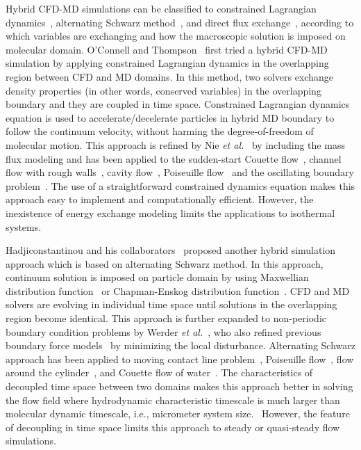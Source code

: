 \documentclass[preprint,12pt]{elsarticle}
\begin{document}
Hybrid CFD-MD simulations can be classified to constrained Lagrangian dynamics~\cite{Thompson,Nie,Nie_cavity,Cui,Wang,Yen,Liu}, alternating Schwarz method~\cite{Hadjicon1,Hadjicon2,Hadjicon3,Werder,Kotsalis}, and direct flux exchange~\cite{Flekkoy,Wagner,Delgado1,USHER,Time_Mechanism,Giupponi}, according to which variables are exchanging and how the macroscopic solution is imposed on molecular domain. O'Connell and Thompson~\cite{Thompson} first tried a hybrid CFD-MD simulation by applying constrained Lagrangian dynamics in the overlapping region between CFD and MD domains. In this method, two solvers exchange density properties (in other words, conserved variables) in the overlapping boundary and they are coupled in time space. Constrained Lagrangian dynamics equation is used to accelerate/decelerate particles in hybrid MD boundary to follow the continuum velocity, without harming the degree-of-freedom of molecular motion. This approach is refined by Nie {\it{et al.}}~\cite{Nie} by including the mass flux modeling and has been applied to the sudden-start Couette flow~\cite{Thompson}, channel flow with rough walls~\cite{Nie}, cavity flow~\cite{Nie_cavity}, Poiseuille flow~\cite{Yen} and the oscillating boundary problem~\cite{Wang,Liu}. The use of a straightforward constrained dynamics equation makes this approach easy to implement and computationally efficient. However, the inexistence of energy exchange modeling limits the applications to isothermal systems.~\cite{Flekkoy}

Hadjiconstantinou and his collaborators~\cite{Hadjicon1,Hadjicon2,Hadjicon3} proposed another hybrid simulation approach which is based on alternating Schwarz method. In this approach, continuum solution is imposed on particle domain by using Maxwellian distribution function~\cite{Hadjicon2} or Chapman-Enskog distribution function~\cite{Garcia}. CFD and MD solvers are evolving in individual time space until solutions in the overlapping region become identical. This approach is further expanded to non-periodic boundary condition problems by Werder {\it{et al.}}~\cite{Werder}, who also refined previous boundary force models~\cite{Thompson,Flekkoy,Delgado1,Nie} by minimizing the local disturbance. Alternating Schwarz approach has been applied to moving contact line problem~\cite{Hadjicon2}, Poiseuille flow~\cite{Hadjicon3}, flow around the cylinder~\cite{Werder}, and Couette flow of water~\cite{Kotsalis}. The characteristics of decoupled time space between two domains makes this approach better in solving the flow field where hydrodynamic characteristic timescale is much larger than molecular dynamic timescale, i.e., micrometer system size.~\cite{Hadjicon2} However, the feature of decoupling in time space limits this approach to steady or quasi-steady flow simulations.~\cite{Flekkoy}
\end{document}
